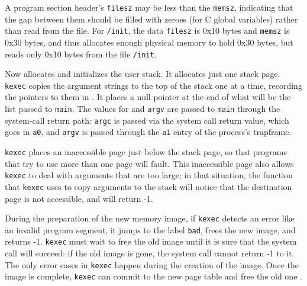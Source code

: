 A program section header's
\lstinline{filesz}
may be less than the
\lstinline{memsz},
indicating that the gap between them should be filled
with zeroes (for C global variables) rather than read from the file.
For
\lstinline{/init}, the data
\lstinline{filesz}
is 0x10 bytes and
\lstinline{memsz}
is 0x30 bytes,
and thus
allocates enough physical memory to hold 0x30 bytes, but reads only 0x10 bytes
from the file
\lstinline{/init}.

Now
allocates and initializes the user stack.
It allocates just one stack page.
\lstinline{kexec}
copies the argument strings to the top of the stack
one at a time, recording the pointers to them in
.
It places a null pointer at the end of what will be the
list passed to
\lstinline{main}.
The values for  and \lstinline{argv} are passed to \lstinline{main}
through the system-call return path:  \lstinline{argc} is passed via the
system call return value, which goes in {\tt a0}, and \lstinline{argv} is passed through
the {\tt a1} entry of the process's trapframe.

\lstinline{kexec}
places an inaccessible page just below the stack page,
so that programs that try to use more than one page will fault.
This inaccessible page also allows
\lstinline{kexec}
to deal with arguments that are too large;
in that situation,
the
function that
\lstinline{kexec}
uses to copy arguments to the stack will notice that
the destination page is not accessible, and will
return -1.

During the preparation of the new memory image,
if
\lstinline{kexec}
detects an error like an invalid program segment,
it jumps to the label
\lstinline{bad},
frees the new image,
and returns -1.
\lstinline{kexec}
must wait to free the old image until it
is sure that the system call will succeed:
if the old image is gone,
the system call cannot return -1 to it.
The only error cases in
\lstinline{kexec}
happen during the creation of the image.
Once the image is complete,
\lstinline{kexec}
can commit to the new page table
and free the old one
.

